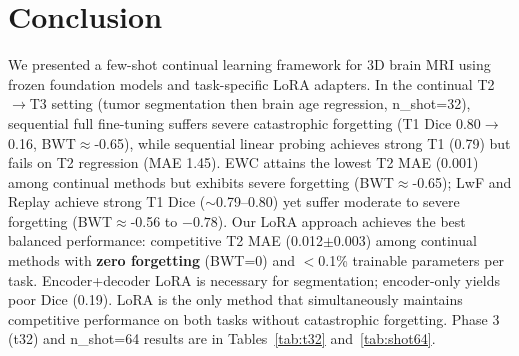 \section{Conclusion}
\label{sec:conclusion}

We presented a few-shot continual learning framework for 3D brain MRI using frozen foundation models and task-specific LoRA adapters. In the continual T2$\to$T3 setting (tumor segmentation then brain age regression, n\_shot=32), sequential full fine-tuning suffers severe catastrophic forgetting (T1 Dice 0.80$\to$0.16, BWT$\approx$-0.65), while sequential linear probing achieves strong T1 (0.79) but fails on T2 regression (MAE 1.45). EWC attains the lowest T2 MAE (0.001) among continual methods but exhibits severe forgetting (BWT$\approx$-0.65); LwF and Replay achieve strong T1 Dice ($\sim$0.79--0.80) yet suffer moderate to severe forgetting (BWT$\approx$-0.56 to $-0.78$). Our LoRA approach achieves the best balanced performance: competitive T2 MAE (0.012$\pm$0.003) among continual methods with \textbf{zero forgetting} (BWT=0) and $<$0.1\% trainable parameters per task. Encoder+decoder LoRA is necessary for segmentation; encoder-only yields poor Dice (0.19). LoRA is the only method that simultaneously maintains competitive performance on both tasks without catastrophic forgetting. Phase 3 (t32) and n\_shot=64 results are in Tables~\ref{tab:t32} and~\ref{tab:shot64}.
